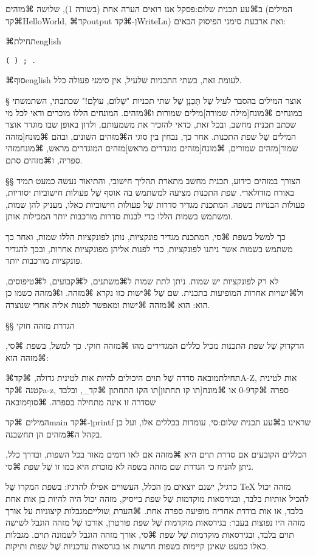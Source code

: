 ב⌘עע תכנית שלום:פסקל אנו רואים הערה אחת (בשורה 1), שלושה ⌘מזהים (המילים
⌘קד{HelloWorld}, ⌘קד{output} וְ-⌘קד{WriteLn}) ואת ארבעת סימני הפיסוק הבאים:

⌘תחילת{english}
\let\ttfamily=\listingsfont
\begin{verbatim}
( ) ; .
\end{verbatim}
⌘סוף{english}
לעומת זאת, בשתי התכניות שלעיל, אין סימני פעולה כלל.

§ אוצר המילים
בהסבר לעיל שֶׁל תָּכְנָן שֶׁל שתי תכניות "שָׁלוֹם, עוֹלָם!" שכתבתי, השתמשתי במונחים
⌘מונח[מילה שמורה]{מילים שמורות} ו⌘מזהים. המונחים הללו מוכרים
ודאי לכל מי שכתב תכנית מחשב,
ובכל זאת, כדאי להזכיר את משמעותם, ולדון באופן שבו מוגדר אוצר המילים שֶׁל שפת
התכנות. אחר כך, נבחין בין סוגי ה⌘מזהים השונים, ובהם
⌘מונח[מזהה שמור]{מזהים שמורים},
⌘מונח[מזהים מוגדרים מראש]{מזהים המוגדרים מראש}, ⌘מונח{מזהי ספריה}, ו⌘מזהים סתם.

§§ הצורך במזהים
כידוע, תכנית מחשב מתארת תהליך חישובי, והתיאור נעשה כמעט תמיד באורח מודולארי.
שפת התכנות מציעה למשתמש בה אוסף שֶׁל פעולות חישוביות יסודיות, פעולות הבנויות
בשפה. המתכנת מגדיר סדרות שֶׁל פעולות חישוביות כאלו, מעניק להן שמות, ומשתמש
בשמות הללו כדי לבנות סדרות מורכבות יותר המכילות אותן.

כך למשל בשפת ⌘סי, המתכנת מגדיר פונקציות, נותן לפונקציות הללו שמות, ואחר כך
משתמש בשמות אשר ניתנו לפונקציות, כדי לפנות אליהן מפונקציות אחרות, ובכך להגדיר
פונקציות מורכבות יותר.

לא רק לפונקציות יש שמות. ניתן לתת שמות ל⌘משתנים, ל⌘קבועים,
ל⌘טיפוסים, ול⌘ישויות
אחרות המופיעות בתכנית. שם שֶׁל ⌘ישות כזו נקרא ⌘מזהה.
ו⌘מזהה כשמו כן הוא: הוא ⌘מזהה ⌘ישות ומאפשר לפנות אליה אחרי
שנוצרה.

§§ הגדרת מזהה חוקי

הדקדוק שֶׁל שפת התכנות מכיל כללים המגדירים מהו ⌘מזהה חוקי.
כך למשל, בשפת ⌘סי, ⌘מזהה הוא:

⌘תחילת{מובאה}
סדרה שֶׁל תוים היכולים להיות אות לטינית גדולה, ⌘קד{A-Z},
אות לטינית קטנה ⌘קד{a-z}, ספרה ⌘קד{0-9} או
⌘מונח[תו קו תחתון]{תו הקו התחתון}
⌘קד{\_},
ובלבד שסדרה זו אינה מתחילה בספרה.
⌘סוף{מובאה}

המילים ⌘קד{main} וְ-⌘קד{printf} שראינו ב⌘עע תכנית שלום:סי, עומדות בכללים אלו,
ועל כן בקהל ה⌘מזהים הן תחשבנה.

הכללים הקובעים אם סדרת תוים היא ⌘מזהה אם לאו דומים מאוד בכל השפות,
ובדרך כלל, ניתן להניח כי הגדרת שם מזהה בשפה לא מוכרת היא כמו זו שֶׁל שפת ⌘סי.

כרגיל, ישנם יוצאים מן הכלל, העשויים אפילו להרגיז: בשפת המקרו שֶׁל \TeX{} מזהה
יכול להכיל אותיות בלבד, ובגירסאות מוקדמות שֶׁל שפת בייסיק, מזהה יכול היה להיות
בן אות אחת בלבד, או אות בודדת אחריה מופיעה ספרה אחת.%
⌘הערת␣שוליים{מגבלות
  קיצוניות על אורך מזהה היו נפוצות בעבר: בגירסאות מוקדמות שֶׁל שפת פורטרן, אורכו שֶׁל
  מזהה הוגבל לשישה תוים בלבד, ובגירסאות מוקדמות שֶׁל שפת ⌘סי, אורך מזהה הוגבל
  לשמונה תוים. מגבלות כאלו כמעט שאינן קיימות בשפות חדשות או בגרסאות עדכניות שֶׁל
שפות ותיקות.}

